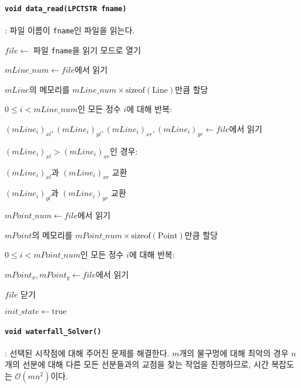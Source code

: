 \paragraph{\texttt{void data_read(LPCTSTR fname)}}: 파일 이름이 \texttt{fname}인 파일을 읽는다.
\begin{algorithm}
	\item $file \leftarrow $ 파일 \texttt{fname}을 읽기 모드로 열기
	\item $mLine\_num \leftarrow file$에서 읽기
	\item $mLine$의 메모리를 $mLine\_num \times \mathrm{sizeof}\left(\mathrm{Line}\right)$만큼 할당
	\item $0 \leq i < mLine\_num$인 모든 정수 $i$에 대해 반복:
	\begin{algorithm}
		\item $\left(mLine_i\right)_{xl}, \left(mLine_i\right)_{yl}, \left(mLine_i\right)_{xr}, \left(mLine_i\right)_{yr} \leftarrow file$에서 읽기
		\item $\left(mLine_i\right)_{xl} > \left(mLine_i\right)_{xr}$인 경우:
		\begin{algorithm}
			\item $\left(mLine_i\right)_{xl}$과 $\left(mLine_i\right)_{xr}$ 교환
			\item $\left(mLine_i\right)_{yl}$과 $\left(mLine_i\right)_{yr}$ 교환
		\end{algorithm}
	\end{algorithm}
	\item $mPoint\_num \leftarrow file$에서 읽기
	\item $mPoint$의 메모리를 $mPoint\_num \times \mathrm{sizeof}\left(\mathrm{Point}\right)$만큼 할당
	\item $0 \leq i < mPoint\_num$인 모든 정수 $i$에 대해 반복:
	\begin{algorithm}
		\item $mPoint_x, mPoint_y \leftarrow file$에서 읽기
	\end{algorithm}
	\item $file$ 닫기
	\item $init\_state \leftarrow \mathrm{true}$
\end{algorithm}

\paragraph{\texttt{void waterfall_Solver()}}: 선택된 시작점에 대해 주어진 문제를 해결한다.
$m$개의 물구멍에 대해 최악의 경우 $n$개의 선분에 대해 다른 모든 선분들과의 교점을 찾는 작업을 진행하므로,
시간 복잡도는 $\mathcal{O}\left(mn^2\right)$이다.


